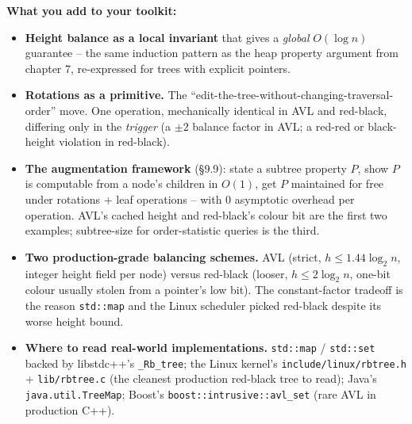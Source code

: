 \documentclass[11pt]{article}
\begin{document}
\begin{ideabox}
\textbf{What you add to your toolkit:}
\begin{itemize}
    \item \textbf{Height balance as a local invariant} that gives a
          \emph{global} $O(\log n)$ guarantee -- the same induction
          pattern as the heap property argument from chapter 7,
          re-expressed for trees with explicit pointers.
    \item \textbf{Rotations as a primitive.} The
          ``edit-the-tree-without-changing-traversal-order'' move.
          One operation, mechanically identical in AVL and red-black,
          differing only in the \emph{trigger} (a $\pm 2$ balance
          factor in AVL; a red-red or black-height violation in
          red-black).
    \item \textbf{The augmentation framework} (\S9.9): state a
          subtree property $P$, show $P$ is computable from a node's
          children in $O(1)$, get $P$ maintained for free under
          rotations + leaf operations -- with $0$ asymptotic
          overhead per operation. AVL's cached height and red-black's
          colour bit are the first two examples; subtree-size for
          order-statistic queries is the third.
    \item \textbf{Two production-grade balancing schemes.} AVL
          (strict, $h \le 1.44 \log_2 n$, integer height field per
          node) versus red-black (looser, $h \le 2 \log_2 n$,
          one-bit colour usually stolen from a pointer's low bit).
          The constant-factor tradeoff is the reason \texttt{std::map}
          and the Linux scheduler picked red-black despite its worse
          height bound.
    \item \textbf{Where to read real-world implementations.}
          \texttt{std::map} / \texttt{std::set} backed by libstdc++'s
          \texttt{\_Rb\_tree}; the Linux kernel's
          \texttt{include/linux/rbtree.h} + \texttt{lib/rbtree.c}
          (the cleanest production red-black tree to read);
          Java's \texttt{java.util.TreeMap}; Boost's
          \texttt{boost::intrusive::avl\_set} (rare AVL in
          production C++).
\end{itemize}


\end{ideabox}
\end{document}
